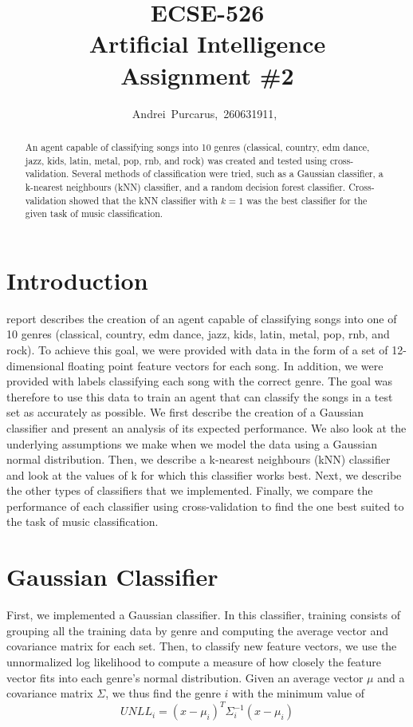 \documentclass[journal,hidelinks]{IEEEtran}
\title{ECSE-526 \\ Artificial Intelligence \\ Assignment \#2}
\author{Andrei~Purcarus,~260631911,~\IEEEmembership{McGill~University}}
\begin{document}
\sloppy

\maketitle

\begin{abstract}

An agent capable of classifying songs into 10 genres (classical, country, edm dance, jazz, kids, latin, metal, pop, rnb, and rock) was created and tested using cross-validation. Several methods of classification were tried, such as a Gaussian classifier, a k-nearest neighbours (kNN) classifier, and a random decision forest classifier. Cross-validation showed that the kNN classifier with $k = 1$ was the best classifier for the given task of music classification.

\end{abstract}

\section{Introduction}

 report describes the creation of an agent capable of classifying songs into one of 10 genres (classical, country, edm dance, jazz, kids, latin, metal, pop, rnb, and rock).
To achieve this goal, we were provided with data in the form of a set of 12-dimensional floating point feature vectors for each song. In addition, we were provided with labels classifying each song with the correct genre.
The goal was therefore to use this data to train an agent that can classify the songs in a test set as accurately as possible.
We first describe the creation of a Gaussian classifier and present an analysis of its expected performance. We also look at the underlying assumptions we make when we model the data using a Gaussian normal distribution.
Then, we describe a k-nearest neighbours (kNN) classifier and look at the values of k for which this classifier works best.
Next, we describe the other types of classifiers that we implemented.
Finally, we compare the performance of each classifier using cross-validation to find the one best suited to the task of music classification.

\section{Gaussian Classifier}
\label{sec:gauss}

First, we implemented a Gaussian classifier. In this classifier, training consists of grouping all the training data by genre and computing the average vector and covariance matrix for each set. Then, to classify new feature vectors, we use the unnormalized log likelihood to compute a measure of how closely the feature vector fits into each genre's normal distribution. Given an average vector $\mu$ and a covariance matrix $\Sigma$, we thus find the genre $i$ with the minimum value of
\[ UNLL_{i} = (x - \mu_{i})^T \Sigma_{i}^{-1} (x - \mu_{i}) \]
\end{document}
